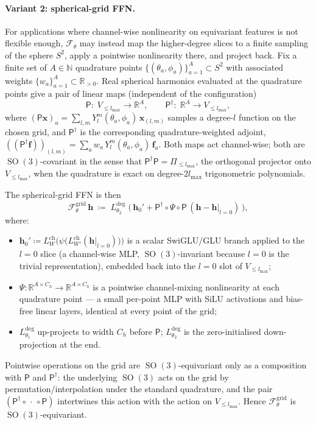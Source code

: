 \documentclass[11pt,a4paper]{article}
\DeclareMathOperator{\SO}{SO}
\newcommand{\R}{\mathbb{R}}
\newcommand{\N}{\mathbb{N}}
\newcommand{\Sph}{S^2}
\newcommand{\bx}{\bm{x}}
\newcommand{\bh}{\bm{h}}
\newcommand{\lmax}{l_{\max}}
\theoremstyle{plain}
\theoremstyle{definition}
\theoremstyle{remark}
\begin{document}
\paragraph{Variant 2: spherical-grid FFN.}
For applications where channel-wise nonlinearity on equivariant features is not
flexible enough, $\mathcal{F}_\theta$ may instead map the higher-degree slices
to a finite sampling of the sphere $\Sph$, apply a pointwise nonlinearity
there, and project back. Fix a finite set of $A\in\N$ quadrature points
$\{(\theta_a,\phi_a)\}_{a=1}^A\subset\Sph$ with associated weights
$\{w_a\}_{a=1}^A\subset\R_{>0}$. Real spherical harmonics evaluated at the
quadrature points give a pair of linear maps (independent of the configuration)
\begin{equation}\label{eq:s2-grid}
    \mathsf{P}:\;V_{\le\lmax}\to\R^{A},\qquad \mathsf{P}^{\dagger}:\;\R^{A}\to V_{\le\lmax},
\end{equation}
where $(\mathsf{P}\bx)_a=\sum_{l,m}Y_l^m(\theta_a,\phi_a)\,\bx_{(l,m)}$ samples a degree-$l$ function on the chosen grid, and $\mathsf{P}^{\dagger}$ is the corresponding quadrature-weighted adjoint, $((\mathsf{P}^{\dagger}\bm{f}))_{(l,m)}=\sum_{a}w_a\,Y_l^m(\theta_a,\phi_a)\,\bm{f}_a$.
Both maps act channel-wise; both are $\SO(3)$-covariant in the sense that $\mathsf{P}^{\dagger}\mathsf{P}=\Pi_{\le\lmax}$, the orthogonal projector onto $V_{\le\lmax}$, when the quadrature is exact on degree-$2\lmax$ trigonometric polynomials.

The spherical-grid FFN is then
\begin{equation}\label{eq:effn-grid}
    \mathcal{F}_\theta^{\mathrm{grid}}\,\bh
    \;\coloneqq\;
    L^{\mathrm{deg}}_{\theta_2}\;\bigl(\,\bh_0' + \mathsf{P}^{\dagger}\circ \Psi \circ \mathsf{P}\,(\bh - \bh|_{l=0})\,\bigr),
\end{equation}
where:
\begin{itemize}[leftmargin=2em]
    \item $\bh_0'\coloneqq L^{\mathrm{ch}}_W\bigl(\psi\bigl(L^{\mathrm{ch}}_{W'}(\bh|_{l=0})\bigr)\bigr)$ is a scalar SwiGLU/GLU branch applied to the $l=0$ slice (a channel-wise MLP, $\SO(3)$-invariant because $l=0$ is the trivial representation), embedded back into the $l=0$ slot of $V_{\le\lmax}$;
    \item $\Psi:\R^{A\times C_h}\to\R^{A\times C_h}$ is a pointwise channel-mixing nonlinearity at each quadrature point — a small per-point MLP with SiLU activations and bias-free linear layers, identical at every point of the grid;
    \item $L^{\mathrm{deg}}_{\theta_1}$ up-projects to width $C_h$ before $\mathsf{P}$; $L^{\mathrm{deg}}_{\theta_2}$ is the zero-initialised down-projection at the end.
\end{itemize}
Pointwise operations on the grid are $\SO(3)$-equivariant only as a composition with $\mathsf{P}$ and $\mathsf{P}^{\dagger}$: the underlying $\SO(3)$ acts on the grid by permutation/interpolation under the standard quadrature, and the pair $(\mathsf{P}^{\dagger}\circ\,\cdot\,\circ\mathsf{P})$ intertwines this action with the action on $V_{\le\lmax}$.
Hence $\mathcal{F}_\theta^{\mathrm{grid}}$ is $\SO(3)$-equivariant.
\end{document}
